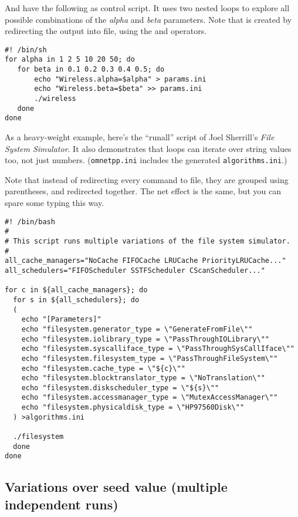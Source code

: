 And have the following as control script. It uses two nested loops to explore
all possible combinations of the \textit{alpha} and \textit{beta} parameters.
Note that  is created by redirecting the 
output into file, using the \ttt{>} and \ttt{>>} operators.

\begin{verbatim}
#! /bin/sh
for alpha in 1 2 5 10 20 50; do
   for beta in 0.1 0.2 0.3 0.4 0.5; do
       echo "Wireless.alpha=$alpha" > params.ini
       echo "Wireless.beta=$beta" >> params.ini
       ./wireless
   done
done
\end{verbatim}


As a heavy-weight example, here's the ``runall'' script of
Joel Sherrill's \textit{File System Simulator}. It also demonstrates
that loops can iterate over string values too, not just numbers.
(\texttt{omnetpp.ini} includes the generated \texttt{algorithms.ini}.)

Note that instead of redirecting every  command to file,
they are grouped using parentheses, and redirected together.
The net effect is the same, but you can spare some typing this way.

\begin{verbatim}
#! /bin/bash
#
# This script runs multiple variations of the file system simulator.
#
all_cache_managers="NoCache FIFOCache LRUCache PriorityLRUCache..."
all_schedulers="FIFOScheduler SSTFScheduler CScanScheduler..."

for c in ${all_cache_managers}; do
  for s in ${all_schedulers}; do
  (
    echo "[Parameters]"
    echo "filesystem.generator_type = \"GenerateFromFile\""
    echo "filesystem.iolibrary_type = \"PassThroughIOLibrary\""
    echo "filesystem.syscalliface_type = \"PassThroughSysCallIface\""
    echo "filesystem.filesystem_type = \"PassThroughFileSystem\""
    echo "filesystem.cache_type = \"${c}\""
    echo "filesystem.blocktranslator_type = \"NoTranslation\""
    echo "filesystem.diskscheduler_type = \"${s}\""
    echo "filesystem.accessmanager_type = \"MutexAccessManager\""
    echo "filesystem.physicaldisk_type = \"HP97560Disk\""
  ) >algorithms.ini

  ./filesystem
  done
done
\end{verbatim}



\subsection{Variations over seed value (multiple independent runs)}

